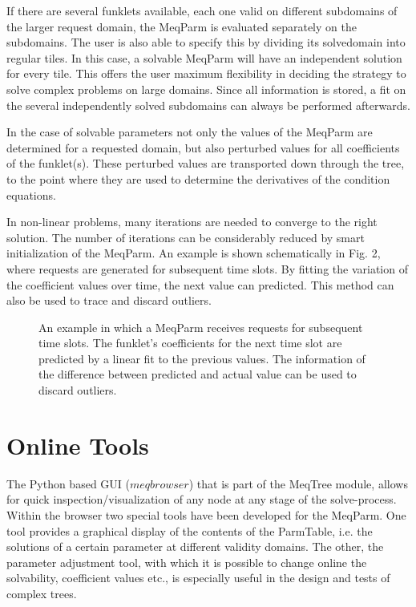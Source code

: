 \documentclass[11pt,twoside]{article}  %
\begin{document}
If there are several funklets available, each one valid on different subdomains
of the larger request domain, the MeqParm is evaluated separately on
the subdomains. 
The user is also able to specify this by
dividing its solvedomain into regular tiles. In this case, a solvable
MeqParm will have an independent solution for every tile.
This offers the user maximum flexibility in deciding the strategy to solve
complex problems on large domains. Since all information is stored, a fit on the several
independently solved subdomains can always be performed afterwards.

In the case of solvable parameters not only the values of the MeqParm
are determined for a requested domain, but also perturbed values for
all coefficients of the funklet(s). These perturbed values are
transported down through the tree, to the point where they are used to
determine the derivatives of the condition equations.

In non-linear problems, many iterations are needed to converge to the
right solution. The number of iterations can be considerably reduced
by smart initialization of the MeqParm. An example is shown
schematically in
Fig. 2, where requests are generated for subsequent
time slots. By fitting the variation of the coefficient values over
time, the next value can predicted. This method can also be used to trace
and discard outliers.
\label{snippetsolver}
\begin{figure}
\caption{An example in which a MeqParm receives requests for
subsequent time slots. The funklet's coefficients for the next time slot
are predicted by a linear fit to the previous values. The information
of the difference between predicted and actual value can be used to
discard outliers.}
\end{figure}



\section{Online Tools}

The Python based GUI ($meqbrowser$) that is part of the MeqTree module,
allows for quick inspection/visualization of any node at any stage of the
solve-process. Within the browser two special tools have been developed for the MeqParm.
One tool provides a graphical display of the contents of the ParmTable,
i.e. the solutions of a certain parameter at different validity
domains. The other, the 
parameter adjustment tool, with which it is possible to change online the
solvability, coefficient values etc., is especially useful in the design and
tests of complex trees.   
\end{document}
